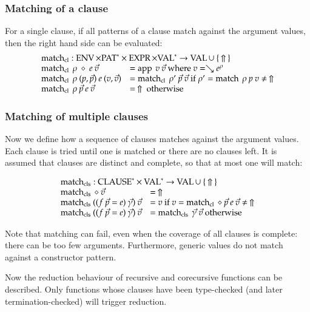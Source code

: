 \subsubsection{Matching of a clause}
For a single clause, if all patterns of a clause match against the argument values, then the right hand side can be evaluated: 
\[
\begin{array}{ll}
\multicolumn{2}{l}{\matchcl : \Env \times \ves{\Pat} \times \Expr \times \ves{\Val} \ra \Val \cup \: \{ \: \stuck \: \} }\\
\matchcl \: \rho \: \diamond \: e \: \vec{v} & = \ap \: v \: \vec{v} \mbox{ where } v = \wh \cl{e}{\rho} \\
\matchcl \: \rho \: (p,\vec{p}) \: e \: (v,\vec{v}) & = \matchcl \: \rho' \: \vec{p} \: \vec{v} \mbox{ if } \rho' = \match \: \rho \: p \: v \neq \: \stuck \\  
\matchcl \: \rho \: \vec{p}\: e \: \vec{v} & = \: \stuck \mbox{ otherwise}\\  
\end{array}
\]

\subsubsection{Matching of multiple clauses} 
Now we define how a sequence of clauses matches against the argument values. 
Each clause is tried until one is matched or there are no clauses left. It is assumed that clauses are distinct and complete, so that at most one will match:

\[
\begin{array}{ll}
\multicolumn{2}{l}{\matchcls : \ves{\Clause} \times \ves{\Val} \ra \Val \cup \: \{ \: \stuck \: \} }\\
\matchcls \: \diamond \: \vec{v} & = \: \stuck \\
\matchcls \:  ((f \: \vec{p} = e)\:\vec{\gamma}) \: \vec{v} & = v \mbox{ if } v = \matchcl \: \diamond \: \vec{p} \: e \:  \vec{v} \neq \: \stuck \\
\matchcls \: ((f \: \vec{p} = e) \:\vec{\gamma}) \: \vec{v} & = \matchcls \: \vec{\gamma} \: \vec{v} \mbox{ otherwise}  
\end{array}
\]

Note that matching can fail, even when the coverage of all clauses is complete: there can be too few arguments. Furthermore, generic values do not match against a constructor pattern. 

Now the reduction behaviour of recursive and corecursive functions can be described.
Only functions whose clauses have been type-checked (and later termination-checked) will trigger reduction.


